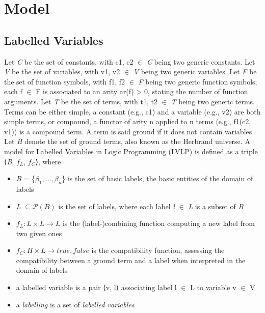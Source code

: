 \section{Model}\label{sec:model_labelled}

\subsection{Labelled Variables}\label{subsec:labelled_variables}

Let \textit{C} be the set of constants, with c1, c2 $\in$ \textit{C} being two generic constants. Let \textit{V} be the set of
variables, with v1, v2 $\in$ \textit{V} being two generic variables. Let \textit{F} be the set of function symbols, with
f1, f2 $\in$ \textit{F} being two generic function symbols; each f $\in$ F is associated to an arity ar(f) > 0,
stating the number of function arguments. Let \textit{T} be the set of terms, with t1, t2 $\in$ \textit{T} being two
generic terms. Terms can be either simple, a constant (e.g., c1) and a variable (e.g., v2) are both
simple terms, or compound, a functor of arity n applied to n terms (e.g., f1(c2, v1)) is a compound term. A term is said ground if it does not contain variables
Let \textit{H} denote the set of ground terms, also known as the Herbrand universe. A model for Labelled Variables in Logic Programming (LVLP) is defined as a triple ⟨\textit{B}, $f_L$, $f_C$⟩,
where
\begin{itemize}
    \item \textit{B} = \{$\beta_1, . . . , \beta_n$\} is the set of basic labels, the basic entities of the domain of labels
    \item \textit{L} $\subseteq \mathcal{P}(\textit{B}) $ is the set of labels, where each label \textit{l} $\in$ \textit{L} is a subset of \textit{B}
    \item $f_L : \textit{L} \times \textit{L} \rightarrow \textit{L}$ is the (label-)combining function computing a new label from two given ones
    \item $f_C : \textit{H} \times \textit{L} \rightarrow {true, false}$ is the compatibility function, assessing the compatibility between
    a ground term and a label when interpreted in the domain of labels
    \item a labelled variable is a pair ⟨v, l⟩ associating label l $\in$ L to variable v $\in$ V
    \item a \textit{labelling} is a set of \textit{labelled variables}
\end{itemize}

